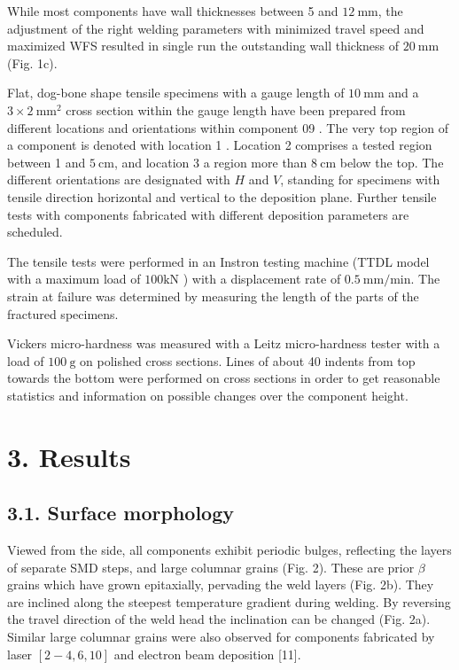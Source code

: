 \documentclass[10pt]{article}
\begin{document}
While most components have wall thicknesses between 5 and $12 \mathrm{~mm}$, the adjustment of the right welding parameters with minimized travel speed and maximized WFS resulted in single run the outstanding wall thickness of $20 \mathrm{~mm}$ (Fig. 1c).

Flat, dog-bone shape tensile specimens with a gauge length of $10 \mathrm{~mm}$ and a $3 \times 2 \mathrm{~mm}^{2}$ cross section within the gauge length have been prepared from different locations and orientations within component 09 . The very top region of a component is denoted with location 1 . Location 2 comprises a tested region between 1 and $5 \mathrm{~cm}$, and location 3 a region more than $8 \mathrm{~cm}$ below the top. The different orientations are designated with $H$ and $V$, standing for specimens with tensile direction horizontal and vertical to the deposition plane. Further tensile tests with components fabricated with different deposition parameters are scheduled.

The tensile tests were performed in an Instron testing machine (TTDL model with a maximum load of $100 \mathrm{kN}$ ) with a displacement rate of $0.5 \mathrm{~mm} / \mathrm{min}$. The strain at failure was determined by measuring the length of the parts of the fractured specimens.

Vickers micro-hardness was measured with a Leitz micro-hardness tester with a load of $100 \mathrm{~g}$ on polished cross sections. Lines of about 40 indents from top towards the bottom were performed on cross sections in order to get reasonable statistics and information on possible changes over the component height.

\section*{3. Results}
\subsection*{3.1. Surface morphology}
Viewed from the side, all components exhibit periodic bulges, reflecting the layers of separate SMD steps, and large columnar grains (Fig. 2). These are prior $\beta$ grains which have grown epitaxially, pervading the weld layers (Fig. 2b). They are inclined along the steepest temperature gradient during welding. By reversing the travel direction of the weld head the inclination can be changed (Fig. 2a). Similar large columnar grains were also observed for components fabricated by laser $[2-4,6,10]$ and electron beam deposition [11].
\end{document}
